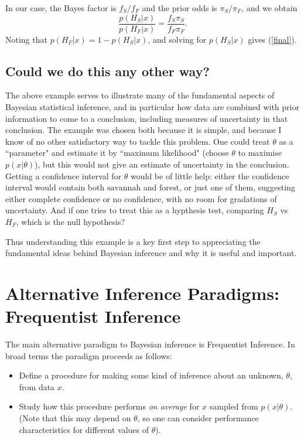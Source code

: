 \documentclass[times,11pt]{article}
\def\s{\mbox{savannah}}
\def\f{\mbox{forest}}
\def\ffA{f_F}
\def\fsA{f_S}
\def\pif{\pi_F}
\def\pis{\pi_S}
\def\Hf{H_F}
\def\Hs{H_S}
\def\data{x}
\begin{document}
In our case, the Bayes factor is $\fsA/\ffA$ and the prior odds is $\pis/\pif$, and we obtain
\begin{equation}
\frac{p(\Hs | \data)}{p(\Hf | \data)} = \frac{\fsA\pis}{\ffA \pif}.
\end{equation}
Noting that $p(\Hf|\data) = 1-p(\Hs|\data)$, and solving for $p(\Hs |\data)$ gives (\ref{final}).

\subsection*{Could we do this any other way?}

The above example serves to illustrate many of the fundamental aspects of Bayesian statistical inference, and in particular how data are combined with prior information to come to a conclusion, including measures of uncertainty in that conclusion. The example was chosen both because it is simple, and because
I know of no other satisfactory way to tackle this problem. One could treat $\theta$ as a ``parameter" and estimate it by ``maximum likelihood" (choose $\theta$ to maximise $p(\data|\theta)$), but this would not give an estimate of uncertainty in the conclusion. Getting a confidence interval for $\theta$ would be of little help: either the confidence interval would contain both $\s$ and $\f$, or just one of them, suggesting either complete confidence or no confidence, with no room for gradations of uncertainty. And if one tries to treat this as a hypthesis test, comparing $\Hs$ vs $\Hf$, which is the null hypothesis? 

Thus understanding this example is a key first step to appreciating
the fundamental ideas behind Bayesian inference and why it is useful and important. 


\section*{Alternative Inference Paradigms: Frequentist Inference}

The main alternative paradigm to Bayesian inference is Frequentist Inference.
In broad terms the paradigm proceeds as follows:
\begin{itemize}
\item Define a procedure for making some kind of inference about an unknown, $\theta$, from data $\data$.
\item Study how this procedure performs {\it on average} for $\data$ sampled from $p(\data|\theta)$. (Note that this may depend on $\theta$, so one can consider performance characteristics for different values of $\theta$).
\end{itemize}
\end{document}
